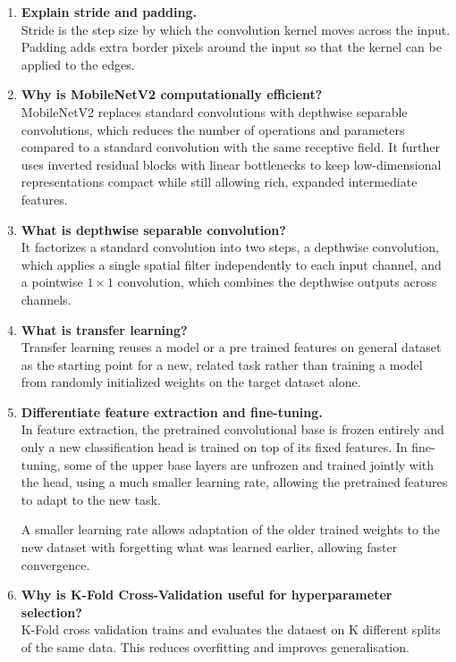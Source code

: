 \documentclass[10pt]{article}
\begin{document}
\begin{enumerate}
\item \textbf{Explain stride and padding.}\\
Stride is the step size  by which the convolution kernel
moves across the input. Padding adds extra border pixels  around the input so that the kernel can be applied to the edges.

\item \textbf{Why is MobileNetV2 computationally efficient?}\\
MobileNetV2 replaces standard convolutions with depthwise separable convolutions, which  reduces the number of operations and parameters compared to a standard
convolution with the same receptive field. It further uses inverted residual blocks with linear bottlenecks to keep low-dimensional representations compact while still allowing rich, expanded intermediate features.

\item \textbf{What is depthwise separable convolution?}\\
It factorizes a standard convolution into two steps, a depthwise convolution, which applies a single spatial filter independently to each input channel, and a pointwise $1\times1$ convolution, which combines the depthwise outputs across channels.

\item \textbf{What is transfer learning?}\\
Transfer learning reuses a model or a pre trained features on general dataset as the starting point for a new, related task rather than training a model from randomly initialized weights on the target dataset alone.

\item \textbf{Differentiate feature extraction and fine-tuning.}\\
In feature extraction, the pretrained convolutional
base is frozen entirely and only a new classification head is trained on top of its fixed features. In fine-tuning, some of the upper base layers are unfrozen and trained jointly with the head, using a much smaller learning rate, allowing the pretrained features to adapt to the new task.

A smaller learning rate allows adaptation of the older trained weights to the new dataset with forgetting what was learned earlier, allowing faster convergence.

\item \textbf{Why is K-Fold Cross-Validation useful for hyperparameter selection?}\\
K-Fold cross validation trains and evaluates the dataest on K different splits of the same data. This reduces overfitting and improves generalisation.


\end{enumerate}
\end{document}
